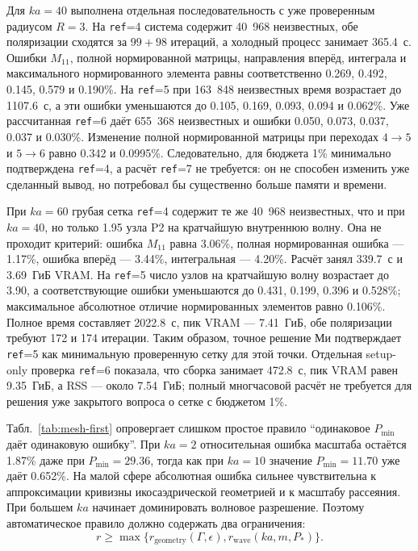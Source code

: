 \documentclass[12pt,a4paper]{article}
\begin{document}
Для $ka=40$ выполнена отдельная последовательность с уже проверенным радиусом
$R=3$. На \texttt{ref}=4 система содержит 40~968 неизвестных, обе поляризации
сходятся за $99+98$ итераций, а холодный процесс занимает 365.4~с. Ошибки
$M_{11}$, полной нормированной матрицы, направления вперёд, интеграла и
максимального нормированного элемента равны соответственно 0.269, 0.492,
0.145, 0.579 и 0.190\%. На \texttt{ref}=5 при 163~848 неизвестных время
возрастает до 1107.6~с, а эти ошибки уменьшаются до 0.105, 0.169, 0.093,
0.094 и 0.062\%. Уже рассчитанная \texttt{ref}=6 даёт 655~368 неизвестных и
ошибки 0.050, 0.073, 0.037, 0.037 и 0.030\%. Изменение полной нормированной
матрицы при переходах $4\to5$ и $5\to6$ равно 0.342 и 0.0995\%.
Следовательно, для бюджета 1\% минимально подтверждена \texttt{ref}=4, а
расчёт \texttt{ref}=7 не требуется: он не способен изменить уже сделанный
вывод, но потребовал бы существенно больше памяти и времени.

При $ka=60$ грубая сетка \texttt{ref}=4 содержит те же 40~968 неизвестных,
что и при $ka=40$, но только 1.95 узла P2 на кратчайшую внутреннюю волну. Она
не проходит критерий: ошибка $M_{11}$ равна 3.06\%, полная нормированная
ошибка --- 1.17\%, ошибка вперёд --- 3.44\%, интегральная --- 4.20\%.
Расчёт занял 339.7~с и 3.69~ГиБ VRAM. На \texttt{ref}=5 число узлов на
кратчайшую волну возрастает до 3.90, а соответствующие ошибки уменьшаются до
0.431, 0.199, 0.396 и 0.528\%; максимальное абсолютное отличие
нормированных элементов равно 0.106\%. Полное время составляет 2022.8~с,
пик VRAM --- 7.41~ГиБ, обе поляризации требуют 172 и 174 итерации.
Таким образом, точное решение Ми подтверждает \texttt{ref}=5 как минимальную
проверенную сетку для этой точки. Отдельная setup-only проверка
\texttt{ref}=6 показала, что сборка занимает 472.8~с, пик VRAM равен
9.35~ГиБ, а RSS --- около 7.54~ГиБ; полный многчасовой расчёт не требуется
для решения уже закрытого вопроса о сетке с бюджетом 1\%.

Табл.~\ref{tab:mesh-first} опровергает слишком простое правило ``одинаковое
$P_{\min}$ даёт одинаковую ошибку''. При $ka=2$ относительная ошибка масштаба
остаётся 1.87\% даже при $P_{\min}=29.36$, тогда как при $ka=10$ значение
$P_{\min}=11.70$ уже даёт 0.652\%. На малой сфере абсолютная ошибка сильнее
чувствительна к аппроксимации кривизны икосаэдрической геометрией и к масштабу
рассеяния. При большем $ka$ начинает доминировать волновое разрешение. Поэтому
автоматическое правило должно содержать два ограничения:
\begin{equation}
  r\ge \max\{r_{\mathrm{geometry}}(\Gamma,\epsilon),
  r_{\mathrm{wave}}(ka,m,P_*)\}.
  \label{eq:two-grid-criteria}
\end{equation}
\end{document}
